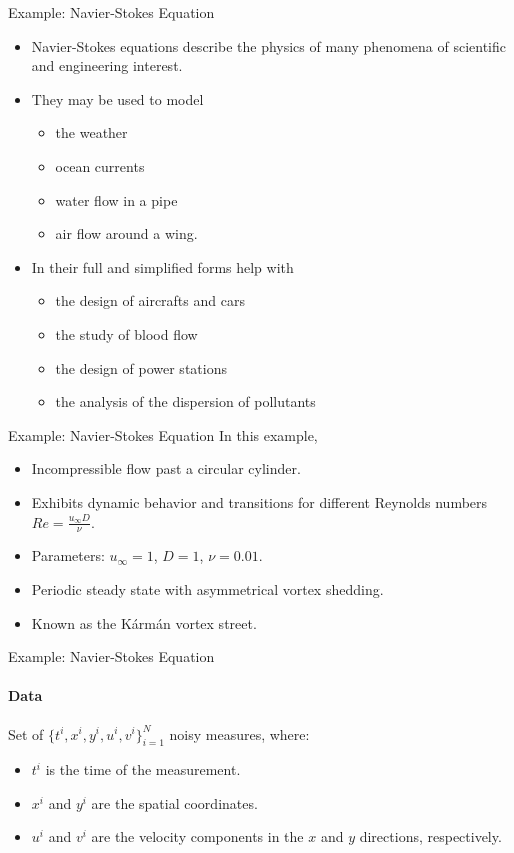 \begin{frame}{Example: Navier-Stokes Equation}

\begin{itemize}
\item Navier-Stokes equations describe the physics of many phenomena of scientiﬁc and engineering interest.
\item They may be used to model
    \begin{itemize}
    \item the weather
    \item ocean currents
    \item water ﬂow in a pipe
    \item air ﬂow around a wing. 
    \end{itemize}
\item In their full and simpliﬁed forms help with
    \begin{itemize}
    \item the design of aircrafts and cars
    \item the study of blood ﬂow
    \item the design of power stations
    \item the analysis of the dispersion of pollutants
    \end{itemize}
\end{itemize}
\end{frame}

\begin{frame}{Example: Navier-Stokes Equation}
In this example, 
\begin{itemize}
    \item Incompressible flow past a circular cylinder.
    \item Exhibits dynamic behavior and transitions for different Reynolds numbers \( Re = \frac{u_\infty D}{\nu} \).
    \item Parameters: \( u_\infty = 1 \), \( D = 1 \), \( \nu = 0.01 \).
    \item Periodic steady state with asymmetrical vortex shedding.
    \item Known as the Kármán vortex street.
\end{itemize}
\end{frame}

\begin{frame}{Example: Navier-Stokes Equation}
\framesubtitle{Data}
Set of $\{t^i, x^i, y^i, u^i, v^i\}_{i=1}^N$ noisy measures, where:
\begin{itemize}
    \item \( t^i \) is the time of the measurement.
    \item \( x^i \) and \( y^i \) are the spatial coordinates.
    \item \( u^i \) and \( v^i \) are the velocity components in the \( x \) and \( y \) directions, respectively.
\end{itemize}
\end{frame}

